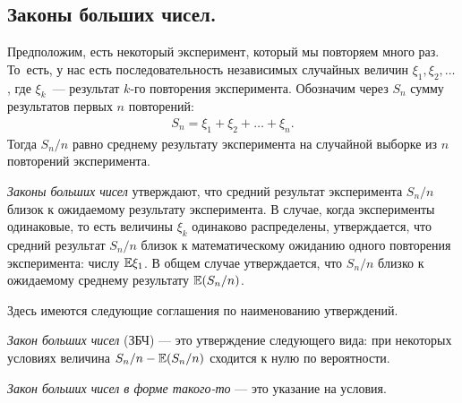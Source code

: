 \documentclass[../main.tex]{subfiles}
\begin{document}
\subsection{Законы больших чисел.}
\label{subsection:law_of_large_numbers}

Предположим, есть некоторый эксперимент, который мы повторяем много раз. То~есть, у нас есть последовательность независимых случайных величин $ \xi_1,\xi_2, \ldots $, где $ \xi_k $~--- результат $ k $-го повторения эксперимента. Обозначим через $ S_n $ сумму результатов первых  $ n $  повторений:
\begin{align*}
 S_n = \xi_1 + \xi_2+\ldots+\xi_n.
\end{align*} Тогда $ S_n/n $ равно среднему результату эксперимента на случайной выборке из $ n $  повторений эксперимента.

\textit{Законы больших чисел} утверждают, что средний результат эксперимента $ S_n/n $ близок к ожидаемому результату эксперимента. В случае, когда эксперименты одинаковые, то есть величины $ \xi_k $ одинаково распределены, утверждается, что средний результат  $ S_n/n $  близок к математическому ожиданию одного повторения эксперимента: числу $ \mathbb E \xi_1 $. В общем случае утверждается, что $ S_n/n $ близко к ожидаемому среднему результату $ \mathbb E (S_n/n) $.

Здесь имеются следующие соглашения по наименованию утверждений.

\textit{Закон больших чисел} (ЗБЧ) --- это утверждение следующего вида: при некоторых условиях величина $ S_n/n-\mathbb E (S_n/n) $ сходится к нулю по вероятности.

\textit{Закон больших чисел в форме такого-то} --- это указание на условия.
\end{document}

